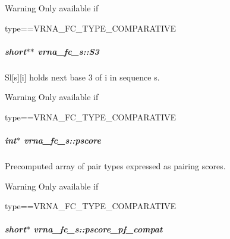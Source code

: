 \begin{DoxyWarning}{Warning}
Only available if\begin{DoxyVerb}type==VRNA_FC_TYPE_COMPARATIVE \end{DoxyVerb}
 
\end{DoxyWarning}
\subparagraph[{\texorpdfstring{S3}{S3}}]{\setlength{\rightskip}{0pt plus 5cm}short$\ast$$\ast$ vrna\+\_\+fc\+\_\+s\+::\+S3}\hypertarget{group__fold__compound_af6ab2a25b84d2308ee23f6b11b5fd52d}{}\label{group__fold__compound_af6ab2a25b84d2308ee23f6b11b5fd52d}


Sl\mbox{[}s\mbox{]}\mbox{[}i\mbox{]} holds next base 3\textquotesingle{} of i in sequence s. 

\begin{DoxyWarning}{Warning}
Only available if\begin{DoxyVerb}type==VRNA_FC_TYPE_COMPARATIVE \end{DoxyVerb}
 
\end{DoxyWarning}
\subparagraph[{\texorpdfstring{pscore}{pscore}}]{\setlength{\rightskip}{0pt plus 5cm}int$\ast$ vrna\+\_\+fc\+\_\+s\+::pscore}\hypertarget{group__fold__compound_a14dc7755af6019ddbd0cf94b209e89dd}{}\label{group__fold__compound_a14dc7755af6019ddbd0cf94b209e89dd}


Precomputed array of pair types expressed as pairing scores. 

\begin{DoxyWarning}{Warning}
Only available if\begin{DoxyVerb}type==VRNA_FC_TYPE_COMPARATIVE \end{DoxyVerb}
 
\end{DoxyWarning}
\subparagraph[{\texorpdfstring{pscore\+\_\+pf\+\_\+compat}{pscore_pf_compat}}]{\setlength{\rightskip}{0pt plus 5cm}short$\ast$ vrna\+\_\+fc\+\_\+s\+::pscore\+\_\+pf\+\_\+compat}\hypertarget{group__fold__compound_abf5e82d14649b6179ae60ed7da6e4fc0}{}\label{group__fold__compound_abf5e82d14649b6179ae60ed7da6e4fc0}


